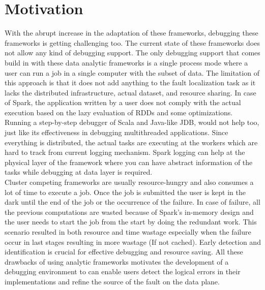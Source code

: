 \documentclass{acm_proc_article-sp}
\begin{document}
\section{Motivation}
With the abrupt increase in the adaptation of these frameworks, debugging these frameworks is getting challenging too. The current state of these frameworks does not allow any kind of debugging support. The only debugging support that comes build in with these data analytic frameworks is a single process mode where a user can run a job in a single computer with the subset of data. The limitation of this approach is that it does not add anything to the fault localization task as it lacks the distributed infrastructure, actual dataset, and resource sharing. In case of Spark, the application written by a user does not comply with the actual execution based on the lazy evaluation of RDDs and some optimizations. Running a step-by-step debugger of Scala and Java-like JDB, would not help too, just like its effectiveness in debugging multithreaded applications. Since everything is distributed, the actual tasks are executing at the workers which are hard to track from current logging mechanism. Spark logging can help at the physical layer of the framework where you can have abstract information of the tasks while debugging at data layer is required.\\
Cluster competing frameworks are usually resource-hungry and also consumes a lot of time to execute a job. Once the job is submitted the user is kept in the dark until the end of the job or the occurrence of the failure. In case of failure, all the previous computations are wasted because of Spark's in-memory design and the user needs to start the job from the start by doing the redundant work. This scenario resulted in both resource and time wastage especially when the failure occur in last stages resulting in more wastage (If not cached).  Early detection and identification is crucial for effective debugging and resource saving. All these drawbacks of using analytic frameworks motivates the development of a debugging environment to can enable users detect the logical errors in their implementations and refine the source of the fault on the data plane.
\end{document}
